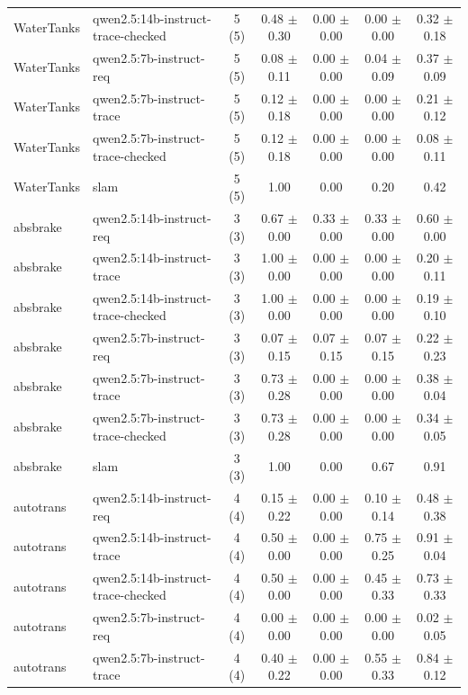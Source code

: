\begin{tabular}{llccccc}
WaterTanks & qwen2.5:14b-instruct-trace-checked & 5 (5) & 0.48 $\pm$ 0.30 & 0.00 $\pm$ 0.00 & 0.00 $\pm$ 0.00 & 0.32 $\pm$ 0.18 \\
WaterTanks & qwen2.5:7b-instruct-req & 5 (5) & 0.08 $\pm$ 0.11 & 0.00 $\pm$ 0.00 & 0.04 $\pm$ 0.09 & 0.37 $\pm$ 0.09 \\
WaterTanks & qwen2.5:7b-instruct-trace & 5 (5) & 0.12 $\pm$ 0.18 & 0.00 $\pm$ 0.00 & 0.00 $\pm$ 0.00 & 0.21 $\pm$ 0.12 \\
WaterTanks & qwen2.5:7b-instruct-trace-checked & 5 (5) & 0.12 $\pm$ 0.18 & 0.00 $\pm$ 0.00 & 0.00 $\pm$ 0.00 & 0.08 $\pm$ 0.11 \\
WaterTanks & slam & 5 (5) & 1.00 & 0.00 & 0.20 & 0.42 \\
absbrake & qwen2.5:14b-instruct-req & 3 (3) & 0.67 $\pm$ 0.00 & 0.33 $\pm$ 0.00 & 0.33 $\pm$ 0.00 & 0.60 $\pm$ 0.00 \\
absbrake & qwen2.5:14b-instruct-trace & 3 (3) & 1.00 $\pm$ 0.00 & 0.00 $\pm$ 0.00 & 0.00 $\pm$ 0.00 & 0.20 $\pm$ 0.11 \\
absbrake & qwen2.5:14b-instruct-trace-checked & 3 (3) & 1.00 $\pm$ 0.00 & 0.00 $\pm$ 0.00 & 0.00 $\pm$ 0.00 & 0.19 $\pm$ 0.10 \\
absbrake & qwen2.5:7b-instruct-req & 3 (3) & 0.07 $\pm$ 0.15 & 0.07 $\pm$ 0.15 & 0.07 $\pm$ 0.15 & 0.22 $\pm$ 0.23 \\
absbrake & qwen2.5:7b-instruct-trace & 3 (3) & 0.73 $\pm$ 0.28 & 0.00 $\pm$ 0.00 & 0.00 $\pm$ 0.00 & 0.38 $\pm$ 0.04 \\
absbrake & qwen2.5:7b-instruct-trace-checked & 3 (3) & 0.73 $\pm$ 0.28 & 0.00 $\pm$ 0.00 & 0.00 $\pm$ 0.00 & 0.34 $\pm$ 0.05 \\
absbrake & slam & 3 (3) & 1.00 & 0.00 & 0.67 & 0.91 \\
autotrans & qwen2.5:14b-instruct-req & 4 (4) & 0.15 $\pm$ 0.22 & 0.00 $\pm$ 0.00 & 0.10 $\pm$ 0.14 & 0.48 $\pm$ 0.38 \\
autotrans & qwen2.5:14b-instruct-trace & 4 (4) & 0.50 $\pm$ 0.00 & 0.00 $\pm$ 0.00 & 0.75 $\pm$ 0.25 & 0.91 $\pm$ 0.04 \\
autotrans & qwen2.5:14b-instruct-trace-checked & 4 (4) & 0.50 $\pm$ 0.00 & 0.00 $\pm$ 0.00 & 0.45 $\pm$ 0.33 & 0.73 $\pm$ 0.33 \\
autotrans & qwen2.5:7b-instruct-req & 4 (4) & 0.00 $\pm$ 0.00 & 0.00 $\pm$ 0.00 & 0.00 $\pm$ 0.00 & 0.02 $\pm$ 0.05 \\
autotrans & qwen2.5:7b-instruct-trace & 4 (4) & 0.40 $\pm$ 0.22 & 0.00 $\pm$ 0.00 & 0.55 $\pm$ 0.33 & 0.84 $\pm$ 0.12 \\

\end{tabular}
